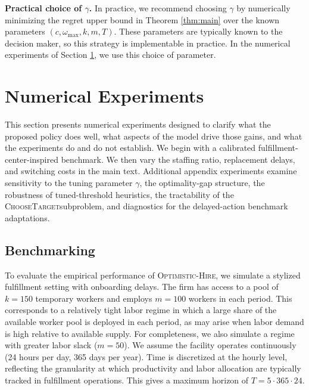 \documentclass[opre,blindrev]{informs3}
\newcommand{\ChooseTarget}{\textsc{ChooseTarget}}
\begin{document}
{\bf Practical choice of \(\gamma\).}
In practice, we recommend choosing \(\gamma\) by numerically minimizing the regret upper bound in Theorem \ref{thm:main} over the known parameters \((c, \omega_{\max}, k, m, T)\). These parameters are typically known to the decision maker, so this strategy is implementable in practice. In the numerical experiments of Section \ref{numerical}, we use this choice of parameter.



\section{Numerical Experiments}
\label{numerical}
This section presents numerical experiments designed to clarify what the proposed policy does well, what aspects of the model drive those gains, and what the experiments do and do not establish. We begin with a calibrated fulfillment-center-inspired benchmark. We then vary the staffing ratio, replacement delays, and switching costs in the main text. Additional appendix experiments examine sensitivity to the tuning parameter \(\gamma\), the optimality-gap structure, the robustness of tuned-threshold heuristics, the tractability of the \ChooseTarget subproblem, and diagnostics for the delayed-action benchmark adaptations.

\vspace{-.1in}

\subsection{Benchmarking}\label{numerical:benchmarks}
To evaluate the empirical performance of \textsc{Optimistic-Hire}, we simulate a stylized fulfillment setting with onboarding delays. The firm has access to a pool of \(k=150\) temporary workers and employs \(m=100\) workers in each period. This corresponds to a relatively tight labor regime in which a large share of the available worker pool is deployed in each period, as may arise when labor demand is high relative to available supply. For completeness, we also simulate a regime with greater labor slack (\(m=50\)). We assume the facility operates continuously (24 hours per day, 365 days per year). Time is discretized at the hourly level, reflecting the granularity at which productivity and labor allocation are typically tracked in fulfillment operations. This gives a maximum horizon of \(T=5 \cdot 365 \cdot 24\). 
\end{document}
